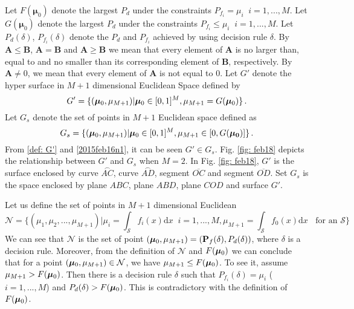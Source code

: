 Let $F(\boldsymbol{\mu}_0)$ denote the largest $P_d$ under the constraints $P_{f_i} = \mu_i\;\;i = 1, ..., M$.
Let $G(\boldsymbol{\mu}_0)$ denote the largest $P_d$ under the constraints $P_{f_i} \leq \mu_i\;\;i = 1, ..., M$.
Let $P_d(\delta)$, $P_{f_i}(\delta)$ denote the $P_d$ and $P_{f_i}$ achieved by using decision rule $\delta$.
By $\mathbf{A} \leq \mathbf{B}$, $\mathbf{A} = \mathbf{B}$ and  $\mathbf{A} \geq \mathbf{B}$ we mean that every element of $\mathbf{A}$ is no larger than, equal to and no smaller than its corresponding element of $\mathbf{B}$, respectively. 
By $\mathbf{A} \neq 0$, we mean that every element of $\mathbf{A}$ is not equal to $0$. 
Let $G'$ denote the hyper surface in $M+1$ dimensional Euclidean Space defined by 
\begin{equation}
 \label{def: G'}
 G' = \{(\boldsymbol{\mu}_0, \mu_{M+1})  | \boldsymbol{\mu}_0 \in [0, 1]^M, \mu_{M+1}= G(\boldsymbol{\mu}_0) \}\,.
\end{equation}
Let $G_s$ denote the set of points in $M+1$ Euclidean space defined as 
\begin{equation}
  \label{2015feb16n1}
G_s =  \{(\boldsymbol{\mu}_0, \mu_{M+1}) | \boldsymbol{\mu}_0\in [0, 1]^M, \mu_{M+1} \in [0, G(\mathbf{\boldsymbol{\mu}_0})]
    \}\,.
  \end{equation}
  From \eqref{def: G'} and \eqref{2015feb16n1}, it can be seen $G' \in G_s$. Fig. \ref{fig: feb18} depicts the relationship between $G'$ and $G_s$ when $M=2$. In Fig. \ref{fig: feb18}, $G'$ is the surface enclosed by curve $\stackrel\frown{AC}$, curve $\stackrel\frown{AD}$, segment $\overline{OC}$ and segment $\overline{OD}$. Set $G_s$ is the space enclosed by plane $ABC$, plane $ABD$, plane $COD$ and surface $G'$.  

Let us define the set of points in $M+1$ dimensional Euclidean
\begin{equation}
  \mathcal{N} = \{(\mu_1, \mu_2, ..., \mu_{M+1}) | \mu_i = \int_{\mathcal{S}}f_i(x)\mathrm{d}x \;\;i=1, ..., M, \mu_{M+1}=\int_{\mathcal{S}}f_{0}(x)\mathrm{d}x \;\;\text{ for an $\mathcal{S}$}\}
\end{equation}
We can see that $\mathcal{N}$ is the set of point $(\boldsymbol{\mu}_0, \mu_{M+1})=(\mathbf{P}_f(\delta), P_d(\delta))$, where $\delta$ is a decision rule. Moreover, from the definition of $\mathcal{N}$ and $F(\boldsymbol{\mu}_0)$ we can conclude that for a point $(\boldsymbol{\mu}_0, \mu_{M+1}) \in \mathcal{N}$, we have $\mu_{M+1} \leq F(\boldsymbol{\mu}_0)$. 
To see it, assume $\mu_{M+1} > F(\boldsymbol{\mu}_0)$. Then there is a decision rule $\delta$ such that $P_{f_i}(\delta) = \mu_i$ ($i=1, ..., M$) and $P_d(\delta) > F(\boldsymbol{\mu}_0)$. This is contradictory with the definition of $F(\boldsymbol{\mu}_0)$. 


